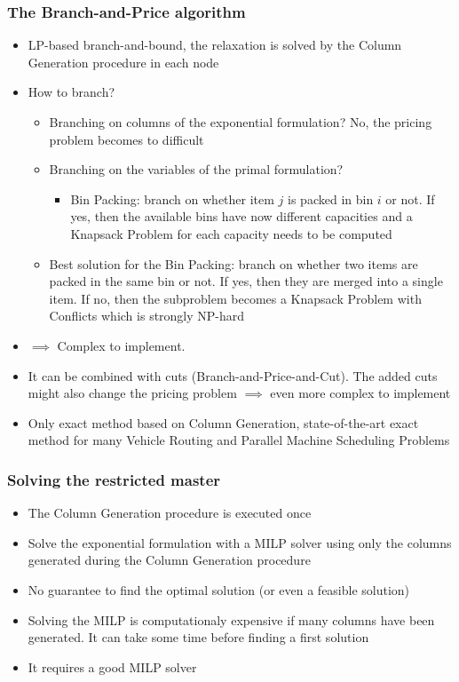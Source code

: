 \documentclass[10pt]{beamer}
\begin{document}
\begin{frame}
  \frametitle{The Branch-and-Price algorithm}
  
  \begin{itemize}
    \item LP-based branch-and-bound, the relaxation is solved by the Column Generation procedure in each node
    \item How to branch?
      \begin{itemize}
        \item Branching on columns of the exponential formulation? No, the pricing problem becomes to difficult
          \item Branching on the variables of the primal formulation?
            \begin{itemize}
              \item Bin Packing: branch on whether item $j$ is packed in bin $i$ or not. If yes, then the available bins have now different capacities and a Knapsack Problem for each capacity needs to be computed
            \end{itemize}
          \item Best solution for the Bin Packing: branch on whether two items are packed in the same bin or not. If yes, then they are merged into a single item. If no, then the subproblem becomes a Knapsack Problem with Conflicts which is strongly NP-hard
      \end{itemize}
      \item $\implies$ Complex to implement.
      \item It can be combined with cuts (Branch-and-Price-and-Cut). The added cuts might also change the pricing problem $\implies$ even more complex to implement
      \item Only exact method based on Column Generation, state-of-the-art exact method for many Vehicle Routing and Parallel Machine Scheduling Problems
  \end{itemize}
\end{frame}

\begin{frame}
  \frametitle{Solving the restricted master}

  \begin{itemize}
    \item The Column Generation procedure is executed once
    \item Solve the exponential formulation with a MILP solver using only the columns generated during the Column Generation procedure
    \item No guarantee to find the optimal solution (or even a feasible solution)
    \item Solving the MILP is computationaly expensive if many columns have been generated. It can take some time before finding a first solution
    \item It requires a good MILP solver 
  \end{itemize}
\end{frame}
\end{document}
